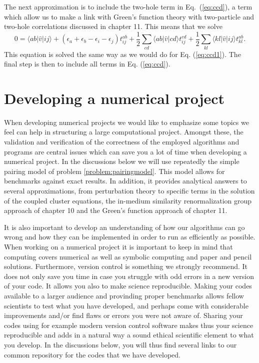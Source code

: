   \noindent
  The next approximation is to include the two-hole term in
  Eq.~(\ref{eq:ccd}), a term which allow us to make a link with
  Green's function theory with two-particle and two-hole
  correlations discussed in chapter 11. This means that we solve
  \begin{equation}
  0 = \langle ab \vert \hat{v} \vert ij \rangle +
  \left(\epsilon_a+\epsilon_b-\epsilon_i-\epsilon_j\right)t_{ij}^{ab}+\frac{1}{2}\sum_{cd}
  \langle ab \vert \hat{v} \vert cd \rangle
  t_{ij}^{cd}+\frac{1}{2}\sum_{kl} \langle kl \vert \hat{v} \vert ij
  \rangle t_{kl}^{ab}.
  \label{eq:ccd2}
  \end{equation}
  This equation is solved the same way as we would do for
  Eq. (\ref{eq:ccd1}). The final step is then to include all terms in
  Eq. (\ref{eq:ccd}).

\section{Developing a numerical project}\label{sec:chap8numproject}

When developing numerical projects we would like to emphasize some
topics we feel can help in structuring a large computational project.
Amongst these, the validation and verification of the correctness of
the employed algorithms and programs are central issues which can
save you a lot of time when developing a numerical project. In the
discussions below we will use repeatedly the simple pairing model of
problem \ref{problem:pairingmodel}.  This model allows for benchmarks
against exact results. In addition, it provides analytical answers to
several approximations, from perturbation theory to specific terms in the solution of the coupled
cluster equations, the in-medium similarity renormalization group
approach of chapter 10 and the Green's function approach of chapter
11. 

It is also important to develop an understanding of how our
algorithms can go wrong and how they can be implemented in order to
run as efficiently as possible. When working on a numerical project it
is important to keep in mind that computing covers numerical as well
as symbolic computing and paper and pencil solutions. Furthermore,
version control is something we strongly recommend. It does not only
save you time in case you struggle with odd errors in a new version of
your code. It allows you also to make science reproducible.  Making
your codes available to a larger audience and provinding proper
benchmarks allows fellow scientists to test what you have developed,
and perhaps come with considerable improvements and/or find flaws
or errors you were not aware of. 
Sharing your codes using for example modern version control
software makes thus your science reproducible and adds in a natural
way a sound ethical scientific element to what you develop.
In the discussions below, you will thus find several links to our 
common repository for the codes that we have developed.


